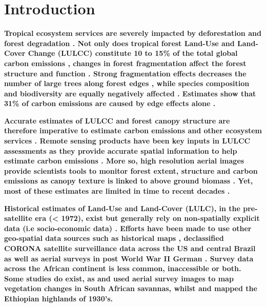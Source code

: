 \documentclass[remote sensing,article,submit,moreauthors,pdftex]{mdpi}
\begin{document}

\hypertarget{introduction}{%
\section{Introduction}\label{introduction}}

\textbf{Tropical ecosystem services are severely impacted by
deforestation and forest degradation
\citep{hansen2013, houghton2012, tyukavina2015}. Not only does tropical
forest Land-Use and Land-Cover Change (LULCC) constitute 10 to 15\% of
the total global carbon emissions \citep{vanderwerf2009}, changes in
forest fragmentation affect the forest structure and function
\citep{fauset2017, brinck2017, didham1999}. Strong fragmentation effects
decreases the number of large trees along forest edges
\citep{laurance2000, magnago2015}, while species composition and
biodiversity are equally negatively affected
\citep{poorter2006, barlow2016, vandeperre2018}. Estimates show that
31\% of carbon emissions are caused by edge effects alone
\citep{brinck2017}.}

\textbf{Accurate estimates of LULCC and forest canopy structure are
therefore imperative to estimate carbon emissions and other ecosystem
services \citep{houghton2012, hansen2013}. Remote sensing products have
been key inputs in LULCC assessments as they provide accurate spatial
information to help estimate carbon emissions
\citep{mitchard2018, hansen2013}. More so, high resolution aerial images
provide scientists tools to monitor forest extent, structure and carbon
emissions as canopy texture is linked to above ground biomass
\citep{Ploton2012, Couteron2005, Barbier2010}. Yet, most of these
estimates are limited in time to recent decades
\citep{defries2002, houghton2012, hansen2013, achard2014}.}

\textbf{Historical estimates of Land-Use and Land-Cover (LULC), in the
pre-satellite era (\textless{} 1972), exist but generally rely on
non-spatially explicit data (i.e socio-economic data)
\citep{houghton2012, ramankutty1999, defries2002, sader1988}. Efforts
have been made to use other geo-spatial data sources such as historical
maps \citep{willcock2016}, declassified CORONA satellite surveillance
data across the US and central Brazil \citep{song2015} as well as aerial
surveys in post World War II German \citep{nita2018}. Survey data across
the African continent is less common, inaccessible or both. Some studies
do exist, as \citet{buitenwerf2012} and \citet{hudak1998} used aerial
survey images to map vegetation changes in South African savannas,
whilst \citet{frankl2015} and \citet{nyssen2016} mapped the Ethiopian
highlands of 1930's.}
\end{document}
